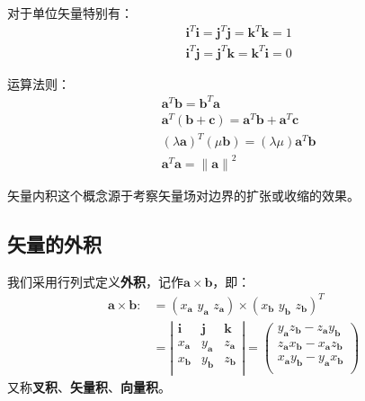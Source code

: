 对于单位矢量特别有：
\begin{align*}
&\mathbf{i}^T\mathbf{i}=\mathbf{j}^T\mathbf{j}=\mathbf{k}^T\mathbf{k}=1 \\
&\mathbf{i}^T\mathbf{j}=\mathbf{j}^T\mathbf{k}=\mathbf{k}^T\mathbf{i}=0
\end{align*}

运算法则：
\begin{align*}
&\boldsymbol{a}^T\boldsymbol{b}=\boldsymbol{b}^T\boldsymbol{a} \\
&\boldsymbol{a}^T\left( \boldsymbol{b}+\boldsymbol{c} \right) =\boldsymbol{a}^T\boldsymbol{b}+\boldsymbol{a}^T\boldsymbol{c} \\
&\left( \lambda \boldsymbol{a} \right) ^T\left( \mu \boldsymbol{b} \right) =\left( \lambda \mu \right) \boldsymbol{a}^T\boldsymbol{b} \\
&\boldsymbol{a}^T\boldsymbol{a}=\left\| \boldsymbol{a} \right\| ^2
\end{align*}

\begin{tcolorbox}
矢量内积这个概念源于考察矢量场对边界的扩张或收缩的效果。
\end{tcolorbox}

\subsection{矢量的外积}

\begin{definition}[外积]
我们采用行列式定义{\bf 外积}，记作$\boldsymbol{a}\times \boldsymbol{b}$，即：
\begin{align*}
\boldsymbol{a}\times \boldsymbol{b}:&=\left( x_{\boldsymbol{a}}\,\,y_{\boldsymbol{a}}\,\,z_{\boldsymbol{a}} \right) \times \left( x_{\boldsymbol{b}}\,\,y_{\boldsymbol{b}}\,\,z_{\boldsymbol{b}} \right) ^T\\
&=\left| \begin{matrix}
	\mathbf{i}&		\mathbf{j}&		\mathbf{k}\\
	x_{\boldsymbol{a}}&		y_{\boldsymbol{a}}&		z_{\boldsymbol{a}}\\
	x_{\boldsymbol{b}}&		y_{\boldsymbol{b}}&		z_{\boldsymbol{b}}\\
\end{matrix} \right|=\left( \begin{array}{c}
	y_{\boldsymbol{a}}z_{\boldsymbol{b}}-z_{\boldsymbol{a}}y_{\boldsymbol{b}}\\
	z_{\boldsymbol{a}}x_{\boldsymbol{b}}-x_{\boldsymbol{a}}z_{\boldsymbol{b}}\\
	x_{\boldsymbol{a}}y_{\boldsymbol{b}}-y_{\boldsymbol{a}}x_{\boldsymbol{b}}\\
\end{array} \right)
\end{align*}
又称{\bf 叉积}、{\bf 矢量积}、{\bf 向量积}。
\end{definition}

